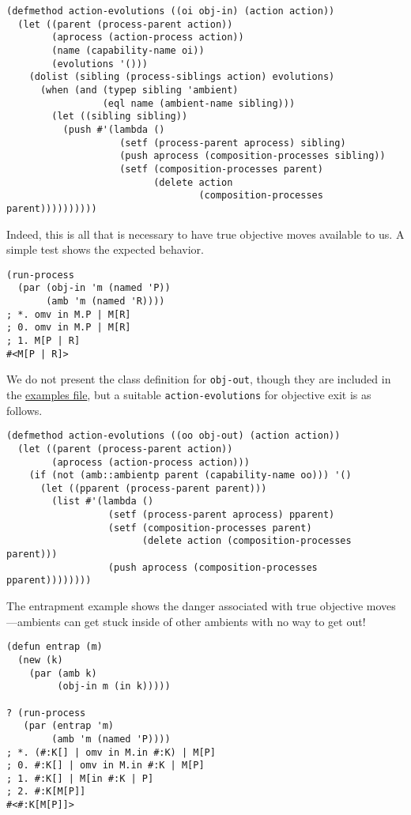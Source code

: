 \documentclass[12pt]{article}
\begin{document}
\begin{verbatim}
(defmethod action-evolutions ((oi obj-in) (action action))
  (let ((parent (process-parent action))
        (aprocess (action-process action))
        (name (capability-name oi))
        (evolutions '()))
    (dolist (sibling (process-siblings action) evolutions)
      (when (and (typep sibling 'ambient)
                 (eql name (ambient-name sibling)))
        (let ((sibling sibling))
          (push #'(lambda ()
                    (setf (process-parent aprocess) sibling)
                    (push aprocess (composition-processes sibling))
                    (setf (composition-processes parent)
                          (delete action
                                  (composition-processes parent))))))))))
\end{verbatim}

Indeed, this is all that is necessary to have true objective moves available to us.
A simple test shows the expected behavior.

\begin{verbatim}
(run-process
  (par (obj-in 'm (named 'P))
       (amb 'm (named 'R))))
; *. omv in M.P | M[R]
; 0. omv in M.P | M[R]
; 1. M[P | R]
#<M[P | R]>
\end{verbatim}

We do not present the class definition for \texttt{obj-out}, though they are included in the \href{http://svn.cs.rpi.edu/svn/tayloj/mobile-ambients/examples.lisp}{examples file}, but a suitable \texttt{action-evolutions} for objective exit is as follows.

\begin{verbatim}
(defmethod action-evolutions ((oo obj-out) (action action))
  (let ((parent (process-parent action))
        (aprocess (action-process action)))
    (if (not (amb::ambientp parent (capability-name oo))) '()
      (let ((pparent (process-parent parent)))
        (list #'(lambda ()
                  (setf (process-parent aprocess) pparent)
                  (setf (composition-processes parent)
                        (delete action (composition-processes parent)))
                  (push aprocess (composition-processes pparent))))))))
\end{verbatim}

The entrapment example shows the danger associated with true objective moves---ambients can get stuck inside of other ambients with no way to get out!

\begin{verbatim}
(defun entrap (m)
  (new (k)
    (par (amb k)
         (obj-in m (in k)))))

? (run-process
   (par (entrap 'm)
        (amb 'm (named 'P))))
; *. (#:K[] | omv in M.in #:K) | M[P]
; 0. #:K[] | omv in M.in #:K | M[P]
; 1. #:K[] | M[in #:K | P]
; 2. #:K[M[P]]
#<#:K[M[P]]>
\end{verbatim}
\end{document}
